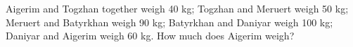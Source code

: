 Aigerim and Togzhan together weigh 40 kg; Togzhan and Meruert weigh 50 kg; Meruert and Batyrkhan weigh 90 kg; Batyrkhan and Daniyar weigh 100 kg; Daniyar and Aigerim weigh 60 kg. How much does Aigerim weigh?
